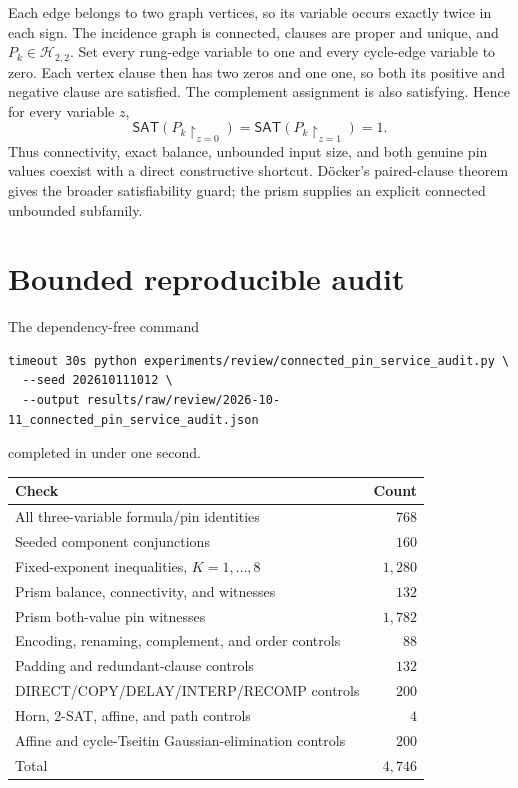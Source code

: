 \documentclass[11pt]{article}
\newcommand{\SAT}{\mathsf{SAT}}
\newcommand{\Htwo}{\mathcal H_{2,2}}
\begin{document}
Each edge belongs to two graph vertices, so its variable occurs exactly twice
in each sign.  The incidence graph is connected, clauses are proper and
unique, and $P_k\in\Htwo$.  Set every rung-edge variable to one and every
cycle-edge variable to zero.  Each vertex clause then has two zeros and one
one, so both its positive and negative clause are satisfied.  The complement
assignment is also satisfying.  Hence for every variable $z$,
\[
 \SAT(P_k\upharpoonright_{z=0})=
 \SAT(P_k\upharpoonright_{z=1})=1.                         \tag{6}
\]
Thus connectivity, exact balance, unbounded input size, and both genuine pin
values coexist with a direct constructive shortcut.  D\"ocker's paired-clause
theorem gives the broader satisfiability guard; the prism supplies an explicit
connected unbounded subfamily.

\section{Bounded reproducible audit}

The dependency-free command
\begin{verbatim}
timeout 30s python experiments/review/connected_pin_service_audit.py \
  --seed 202610111012 \
  --output results/raw/review/2026-10-11_connected_pin_service_audit.json
\end{verbatim}
completed in under one second.

\begin{center}
\begin{tabular}{lr}
\toprule
Check & Count\\
\midrule
All three-variable formula/pin identities & $768$\\
Seeded component conjunctions & $160$\\
Fixed-exponent inequalities, $K=1,\ldots,8$ & $1{,}280$\\
Prism balance, connectivity, and witnesses & $132$\\
Prism both-value pin witnesses & $1{,}782$\\
Encoding, renaming, complement, and order controls & $88$\\
Padding and redundant-clause controls & $132$\\
DIRECT/COPY/DELAY/INTERP/RECOMP controls & $200$\\
Horn, 2-SAT, affine, and path controls & $4$\\
Affine and cycle-Tseitin Gaussian-elimination controls & $200$\\
\midrule
Total & $4{,}746$\\
\bottomrule
\end{tabular}
\end{center}
\end{document}
